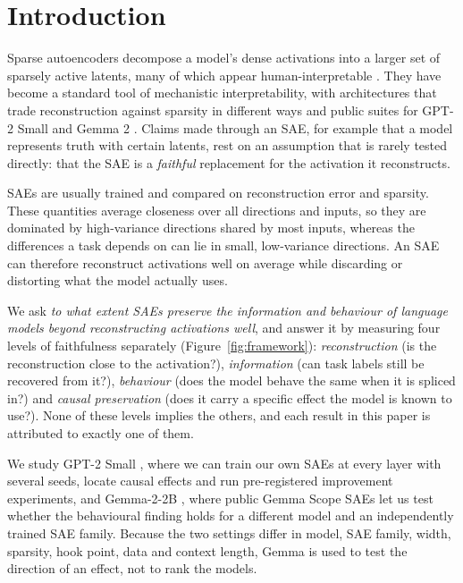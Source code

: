 \section{Introduction}\label{sec:intro}

Sparse autoencoders decompose a model's dense activations into a larger set of sparsely active latents, many of which
appear human-interpretable \citep{bricken2023monosemanticity,cunningham2023sparse}. They have become a standard tool of
mechanistic interpretability, with architectures that trade reconstruction against sparsity in different ways
\citep{gao2024scaling,rajamanoharan2024jumping} and public suites for GPT-2 Small \citep{bloom2024gpt2} and Gemma 2
\citep{gemmascope2024}. Claims made through an SAE, for example that a model represents truth with certain latents,
rest on an assumption that is rarely tested directly: that the SAE is a \emph{faithful} replacement for the activation
it reconstructs.

SAEs are usually trained and compared on reconstruction error and sparsity. These quantities average closeness over
all directions and inputs, so they are dominated by high-variance directions shared by most inputs, whereas the
differences a task depends on can lie in small, low-variance directions. An SAE can therefore reconstruct activations
well on average while discarding or distorting what the model actually uses.

We ask \emph{to what extent SAEs preserve the information and behaviour of language models beyond reconstructing
activations well}, and answer it by measuring four levels of faithfulness separately (Figure~\ref{fig:framework}):
\emph{reconstruction} (is the reconstruction close to the activation?), \emph{information} (can task labels still be
recovered from it?), \emph{behaviour} (does the model behave the same when it is spliced in?) and \emph{causal
preservation} (does it carry a specific effect the model is known to use?). None of these levels implies the others,
and each result in this paper is attributed to exactly one of them.

We study GPT-2 Small \citep{radford2019gpt2}, where we can train our own SAEs at every layer with several seeds,
locate causal effects and run pre-registered improvement experiments, and Gemma-2-2B \citep{gemmateam2024gemma2}, where
public Gemma Scope SAEs let us test whether the behavioural finding holds for a different model and an independently
trained SAE family. Because the two settings differ in model, SAE family, width, sparsity, hook point, data and context
length, Gemma is used to test the direction of an effect, not to rank the models.

